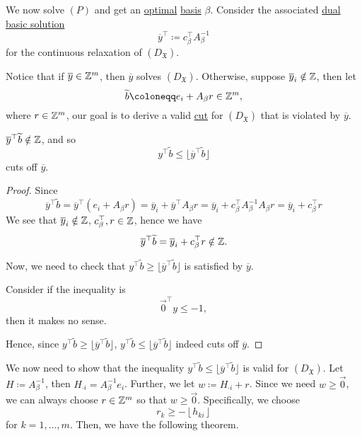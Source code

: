We now solve \((P)\) and get an \hyperref[def:optimal-solution]{optimal} \hyperref[def:basic]{basis} \(\beta\). Consider the associated
\hyperref[def:dual-basic-solution]{dual basic solution}
\[
	\overline{y}^{\top}\coloneqq c_{\beta}^{\top}A^{-1}_{\beta}
\]
for the continuous relaxation of \((D_{\mathfrak{X}})\).

Notice that if \(\overline{y}\in\mathbb{\MakeUppercase{Z}}^m\), then \(\overline{y}\) solves \((D_{\mathfrak{X}})\). Otherwise, suppose
\(\overline{y}_{i}\notin \mathbb{\MakeUppercase{Z}}\), then let
\[
	\widetilde{b}\coloneqq e_{i} + A_{\beta}r\in\mathbb{\MakeUppercase{Z}}^m,
\]
where \(r\in\mathbb{\MakeUppercase{Z}}^m\), our goal is to derive a valid \hyperref[def:Chvatal-Gomory-cut]{cut} for \((D_{\mathfrak{X}})\)
that is violated by \(\overline{y} \).

\begin{theorem}\label{thm:lec24-1}
	\(\overline{y}^{\top}\widetilde{b}\notin \mathbb{\MakeUppercase{Z}}\), and so
	\[
		y^{\top}\widetilde{b}\leq \lfloor \overline{y}^{\top}\widetilde{b} \rfloor
	\]
	cuts off \(\overline{y}\).
\end{theorem}
\begin{proof}
	Since
	\[
		\overline{y}^{\top}\widetilde{b} = \overline{y}^{\top}(e_{i}+A_{\beta}r) = \overline{y}_{i} + \overline{y}^{\top}A_{\beta}r = \overline{y}_{i} +c_{\beta}^{\top}A^{-1}_{\beta}A_{\beta}r = \overline{y}_{i} +c^{\top}_{\beta}r
	\]
	We see that \(\overline{y}_{i}\notin\mathbb{\MakeUppercase{Z}}\), \(c_{\beta}^{\top}, r\in \mathbb{\MakeUppercase{Z}}\), hence we have
	\[
		\overline{y}^{\top}\widetilde{b} = \overline{y}_{i}+c^{\top}_{\beta}r\notin \mathbb{\MakeUppercase{Z}}.
	\]

	Now, we need to check that \(y^{\top}\widetilde{b}\geq \lfloor \overline{y}^{\top}\widetilde{b} \rfloor\) is satisfied by \(\overline{y}\).

	\begin{intuition}
		Consider if the inequality is
		\[
			\vec{0}^{\top}y\leq -1,
		\]
		then it makes no sense.
	\end{intuition}
	Hence, since \(y^{\top}\widetilde{b}\geq \lfloor \overline{y}^{\top}\widetilde{b} \rfloor\), \(y^{\top}\widetilde{b}\leq \lfloor \overline{y}^{\top}\widetilde{b} \rfloor\)
	indeed cuts off \(\overline{y} \).
\end{proof}

We now need to show that the inequality \(y^{\top}\widetilde{b}\leq \lfloor \overline{y}^{\top}\widetilde{b} \rfloor\) is valid for \((D_{\mathfrak{X}})\).
Let \(H\coloneqq A^{-1}_{\beta}\), then \(H_{\cdot i} = A^{-1}_{\beta}e_{i}\). Further, we let \(w\coloneqq H_{\cdot i}+r\). Since we need
\(w\geq \vec{0}\), we can always choose \(r\in \mathbb{\MakeUppercase{Z}}^m\) so that \(w\geq \vec{0}\). Specifically, we choose
\[
	r_k \geq -\left\lfloor h_{ki} \right\rfloor
\] for \(k = 1, \ldots , m\). Then, we have the following theorem.

